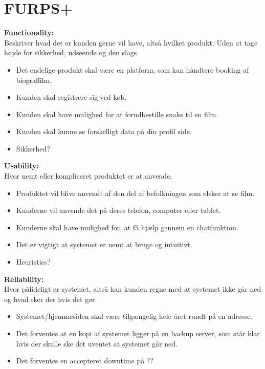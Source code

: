 \section{FURPS+}\label{sec:furps}

\textbf{Functionality:} \\
Beskriver hvad det er kunden gerne vil have, altså hvilket produkt. Uden at tage højde for sikkerhed, udseende og den slags.
\begin{itemize}
    \item Det endelige produkt skal være en platform, som kan håndtere booking af biograffilm.
    \item Kunden skal registrere sig ved køb.
    \item Kunden skal have mulighed for at forudbestille snaks til en film.
    \item Kunden skal kunne se forskelligt data på din profil side.
    \item Sikkerhed? \\
\end{itemize}

\textbf{Usability:} \\
Hvor nemt eller kompliceret produktet er at anvende. 
\begin{itemize}
    \item Produktet vil blive anvendt af den del af befolkningen som elsker at se film.
    \item Kunderne vil anvende det på deres telefon, computer eller tablet.
    \item Kunderne skal have mulighed for, at få hjælp gennem en chatfunktion.
    \item Det er vigtigt at systemet er nemt at bruge og intuitivt.
    \item Heuristics? \\
\end{itemize} 

\textbf{Reliability:} \\
Hvor pålideligt er systemet, altså kan kunden regne med at systemet ikke går ned og hvad sker der hvis det gør.

\begin{itemize}
    \item Systemet/hjemmesiden skal være tilgængelig hele året rundt på en adresse.
    \item Det forventes at en kopi af systemet ligger på en backup server, som står klar hvis der skulle ske det uventet at systemet går ned.
    \item Det forventes en accepteret downtime på ??\\
\end{itemize}

